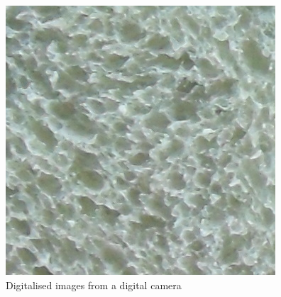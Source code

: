 \documentclass[oneside,a4paper,english,links]{article}
\begin{document}
\begin{figure}[htb]
\includegraphics[scale=0.20]{imagenes/Sa14}
\caption{Digitalised images from a digital camera}
\label{fig:camera}
\end{figure}
\end{document}
